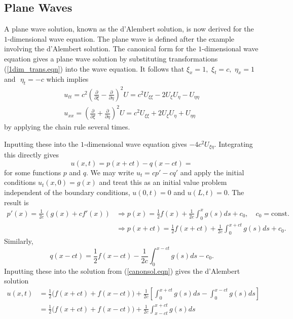 \documentclass[12pt]{article}
\theoremstyle{definition}
\numberwithin{equation}{section}
\begin{document}
\subsection{Plane Waves}\label{plane_waves.sec}
A plane wave solution, known as the d'Alembert solution, is now derived for the $1$-dimensional wave equation. The plane wave is defined after the example involving the d'Alembert solution. The canonical form for the $1$-dimensional wave equation gives a plane wave solution by substituting transformations (\ref{1dim_trans.eqn}) into the wave equation. It follows that $\xi_x=1,\,\,\xi_t=c,\,\,\eta_x=1$ and $\,\,\eta_t=-c$ which implies
\begin{gather}
u_{tt}=c^2\left(\frac{\partial}{\partial\xi}-\frac{\partial}{\partial\eta}\right)^2U=c^2U_{\xi\xi}-2U_\xi U_\eta-U_{\eta\eta}\nonumber\\
u_{xx}=\left(\frac{\partial}{\partial\xi}+\frac{\partial}{\partial\eta}\right)^2 U=c^2 U_{\xi\xi}+2U_\xi U_\eta+U_{\eta\eta}
\end{gather}
by applying the chain rule several times.

Inputting these into the $1$-dimensional wave equation gives $-4c^2U_{\xi\eta}$. Integrating this directly gives
\begin{equation}
u(x,t)=p(x+ct)-q(x-ct)=
\label{canonsol.eqn}
\end{equation}
for some functions $p$ and $q$. We may write $u_t=cp'-cq'$ and apply the initial conditions $u_t(x,0)=g(x)$ and treat this as an initial value problem independent of the boundary conditions, $u(0,t)=0$ and $u(L,t)=0$. The result is
\begin{align*}
p'(x)=\frac{1}{2c}\left(g(x)+cf'(x)\right)&\Rightarrow p(x)=\frac{1}{2}f(x)+\frac{1}{2c}\int_0^x g(s)ds+c_0,\quad c_0=\mbox{const.}\\&\Rightarrow p(x+ct)=\frac{1}{2}f(x+ct)+\frac{1}{2c}\int_0^{x+ct}g(s)ds +c_0.
\end{align*}
Similarly,
$$q(x-ct)=\frac{1}{2}f(x-ct)-\frac{1}{2c}\int_0^{x-ct}g(s)ds -c_0.$$ Inputting these into the solution from (\ref{canonsol.eqn}) gives the d'Alembert solution
\begin{align*}
u(x,t)&=\frac{1}{2}\Big(f(x+ct)+f(x-ct)\Big)+\frac{1}{2c}\left[\int_0^{x+ct}g(s)ds-\int_0^{x-ct}g(s)ds\right]\\
&=\frac{1}{2}\Big(f(x+ct)+f(x-ct)\Big)+\frac{1}{2c}\int_{x-ct}^{x+ct}g(s)ds
\end{align*}
\end{document}
